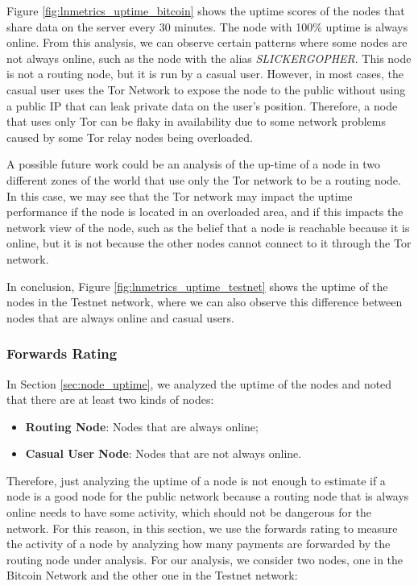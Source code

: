 Figure \ref{fig:lnmetrics_uptime_bitcoin} shows the uptime scores
of the nodes that share data on the server every 30 minutes.
The node with 100\% uptime is always online. From this analysis,
we can observe certain patterns where some nodes are not always
online, such as the node with the alias \emph{SLICKERGOPHER}.
This node is not a routing node, but it is run by a casual user.
However, in most cases, the casual user uses the Tor Network \cite{tor}
to expose the {\LN} node to the public without using a public IP
that can leak private data on the user's position. Therefore, a node
that uses only Tor can be flaky in availability due to some network
problems caused by some Tor relay nodes being overloaded.

A possible future work could be an analysis of the up-time of a node
in two different zones of the world that use only the Tor network to
be a routing node. In this case, we may see that the Tor network may
impact the uptime performance if the node is located in an overloaded
area, and if this impacts the network view of the node, such as the belief that a node is reachable because it is online, but it is
not because the other nodes cannot connect to it through the Tor network.

In conclusion, Figure \ref{fig:lnmetrics_uptime_testnet} shows the uptime of
the nodes in the Testnet network, where we can also observe this
difference between nodes that are always online and casual users.

\subsubsection{Forwards Rating}
\label{sec:forwards_rating}

In Section \ref{sec:node_uptime}, we analyzed the uptime of the nodes 
and noted that there are at least two kinds of nodes:

\begin{itemize}
    \item {\bf Routing Node}: Nodes that are always online;
    \item {\bf Casual User Node}: Nodes that are not always online.
\end{itemize}

Therefore, just analyzing the uptime of a node is not enough to estimate if a node is a 
good node for the public network because a routing node that is always online needs to 
have some activity, which should not be dangerous for the network.
For this reason, in this section, we use the forwards rating to measure the activity of 
a node by analyzing how many payments are forwarded by the routing node under analysis. 
For our analysis, we consider two nodes, one in the Bitcoin Network and the other 
one in the Testnet network:

